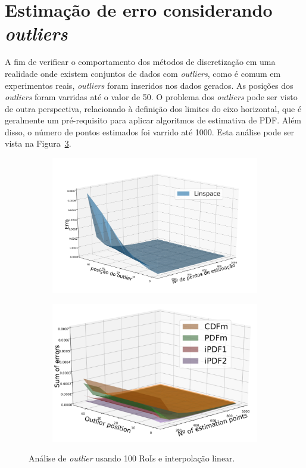 \section{Estimação de erro considerando \textit{outliers}} \label{cap:erro_out}

A fim de verificar o comportamento dos métodos de discretização em uma realidade onde existem conjuntos de dados com \textit{outliers}, como é comum em experimentos reais, \textit{outliers} foram inseridos nos dados gerados. As posições dos \textit{outliers} foram varridas até o valor de 50.
O problema dos \textit{outliers} pode ser visto de outra perspectiva, relacionado à definição dos limites do eixo horizontal, que é geralmente um pré-requisito para aplicar algoritmos de estimativa de \ac{PDF}.
Além disso, o número de pontos estimados foi varrido até 1000. Esta análise pode ser vista na Figura~\ref{fig:13}.

\begin{figure}[H]
	\centering
	\begin{subfigure}[b]{0.45\textwidth}
		\centering 
		\includegraphics[width=\textwidth]{./figuras/erro3d_linspace}
		\caption{}
		\label{fig:13a}
	\end{subfigure}
	\hfill
	\begin{subfigure}[b]{0.45\textwidth}
		\centering 
		\includegraphics[width=\textwidth]{./figuras/figure13b.pdf}
		\caption{}
		\label{fig:13b}
	\end{subfigure}
	\caption{Análise de \textit{outlier} usando 100 RoIs e interpolação linear.}
	\label{fig:13}
\end{figure}

